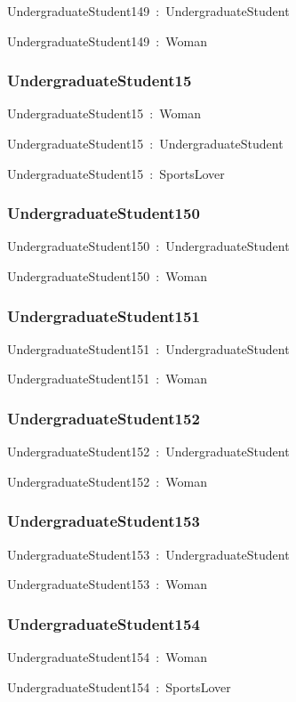 \documentclass{article}
\begin{document}
UndergraduateStudent149~:~UndergraduateStudent

UndergraduateStudent149~:~Woman

\subsubsection*{UndergraduateStudent15}

UndergraduateStudent15~:~Woman

UndergraduateStudent15~:~UndergraduateStudent

UndergraduateStudent15~:~SportsLover

\subsubsection*{UndergraduateStudent150}

UndergraduateStudent150~:~UndergraduateStudent

UndergraduateStudent150~:~Woman

\subsubsection*{UndergraduateStudent151}

UndergraduateStudent151~:~UndergraduateStudent

UndergraduateStudent151~:~Woman

\subsubsection*{UndergraduateStudent152}

UndergraduateStudent152~:~UndergraduateStudent

UndergraduateStudent152~:~Woman

\subsubsection*{UndergraduateStudent153}

UndergraduateStudent153~:~UndergraduateStudent

UndergraduateStudent153~:~Woman

\subsubsection*{UndergraduateStudent154}

UndergraduateStudent154~:~Woman

UndergraduateStudent154~:~SportsLover
\end{document}
